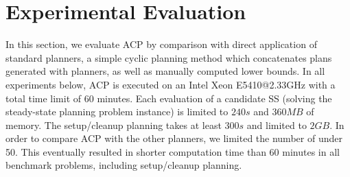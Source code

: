 

\section{Experimental Evaluation}
\label{sec-3}

In this section, we evaluate ACP by comparison with direct application of standard \domind planners, a simple cyclic planning method which concatenates plans generated with \domind planners, as well as manually computed lower bounds.
In all experiments below, ACP is executed
on an Intel Xeon E5410@2.33GHz with a total time limit of 60 minutes.
 Each evaluation of a candidate SS (solving the
  steady-state planning problem instance) is limited to $240\si{s}$
and $360\si{MB}$ of memory. The setup/cleanup planning takes at least $300\si{s}$
and limited to $2\si{GB}$.
In order to compare ACP with the other planners, we limited the number
of \sss under 50. This eventually resulted in shorter computation time
 than 60 minutes in all benchmark problems, including setup/cleanup planning.

